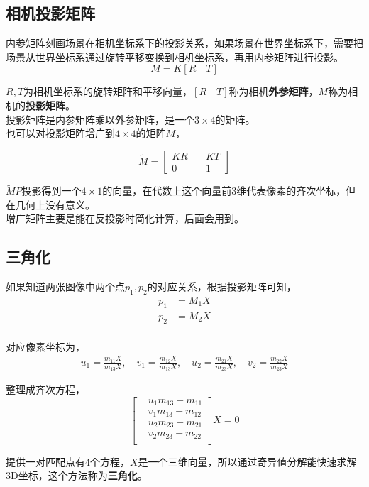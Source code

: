 \subsection{相机投影矩阵}
	内参矩阵刻画场景在相机坐标系下的投影关系，如果场景在世界坐标系下，需要把场景从世界坐标系通过旋转平移变换到相机坐标系，再用内参矩阵进行投影。
	$$
		M = K\left[R\quad T\right]
	$$

	$R,T$为相机坐标系的旋转矩阵和平移向量，$\left[R\quad T\right]$称为相机\textbf{外参矩阵}，$M$称为相机的\textbf{投影矩阵}。\\

	投影矩阵是内参矩阵乘以外参矩阵，是一个$3\times 4$的矩阵。\\

	也可以对投影矩阵增广到$4\times 4$的矩阵$\tilde{M}$，

	$$
		\tilde{M} = \begin{bmatrix}
			KR\quad& KT\\
			0\quad& 1
		\end{bmatrix}
	$$

	$\tilde{M}P$投影得到一个$4\times 1$的向量，在代数上这个向量前3维代表像素的齐次坐标，但在几何上没有意义。\\

	增广矩阵主要是能在反投影时简化计算，后面会用到。

\subsection{三角化}
	如果知道两张图像中两个点$p_1,p_2$的对应关系，根据投影矩阵可知，
	\begin{align*}
		p_1 &= M_1 X\\
		p_2 &= M_2 X\\
	\end{align*}

	对应像素坐标为，
	\begin{align*}
		u_1 = \frac{m_{11} X}{m_{13} X}, \quad v_1 = \frac{m_{12} X}{m_{13} X},\quad
		u_2 = \frac{m_{21} X}{m_{23} X}, \quad v_2 = \frac{m_{22} X}{m_{23} X}
	\end{align*}

	整理成齐次方程，
	$$
		\begin{bmatrix*}
			&u_1m_{13} - m_{11}\\
			&v_1m_{13} - m_{12}\\
			&u_2m_{23} - m_{21}\\
			&v_2m_{23} - m_{22}\\
		\end{bmatrix*} X = 0
	$$

	提供一对匹配点有4个方程，$X$是一个三维向量，所以通过奇异值分解能快速求解3D坐标，这个方法称为\textbf{三角化}。
